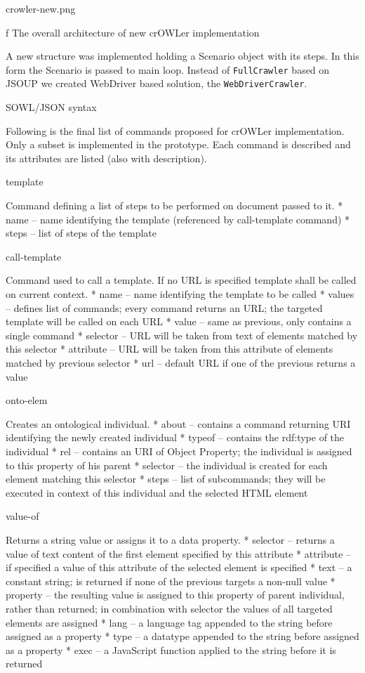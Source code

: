 \midinsert {}
\picw=12cm \cinspic crowler-new.png
\caption/f The overall architecture of new crOWLer implementation
\endinsert

A new structure was implemented holding a Scenario object with its steps.  In
this form the Scenario is passed to main loop. Instead of {\tt FullCrawler}
based on JSOUP we created WebDriver based solution, the {\tt WebDriverCrawler}. 


\sec SOWL/JSON syntax

Following is the final list of commands proposed for crOWLer implementation.
Only a subset is implemented in the prototype. Each command is described and
its attributes are listed (also with description). 


\secc template %

Command defining a list of steps to be performed on document passed to it. 
\begitems
  * name -- name identifying the template (referenced by call-template command)
  * steps -- list of steps of the template
\enditems


\secc call-template %

Command used to call a template. If no URL is specified template shall be
called on current context. 
\begitems
  * name -- name identifying the template to be called
  * values -- defines list of commands; every command returns an URL;
    the targeted template will be called on each URL
  * value -- same as previous, only contains a single command
  * selector -- URL will be taken from text of elements matched by this selector
  * attribute -- URL will be taken from this attribute of elements matched by previous selector
  * url -- default URL if one of the previous returns a value 
\enditems


\secc onto-elem

Creates an ontological individual. 
\begitems
  * about -- contains a command returning URI identifying the newly created individual
  * typeof -- contains the rdf:type of the individual
  * rel -- contains an URI of Object Property; the individual is assigned to this property of his parent
  * selector -- the individual is created for each element matching this selector
  * steps -- list of subcommands; they will be executed in context of this individual
            and the selected HTML element
\enditems


\secc value-of

Returns a string value or assigns it to a data property. 
\begitems
  * selector -- returns a value of text content of the first element specified by this attribute
  * attribute -- if specified a value of this attribute of the selected element is specified
  * text -- a constant string; is returned if none of the previous targets a non-null value
  * property -- the resulting value is assigned to this property of parent
  individual, rather than returned; in combination with selector the values of all
  targeted elements are assigned
  * lang -- a language tag appended to the string before assigned as a property
  * type -- a datatype appended to the string  before assigned as a property
  * exec -- a JavaScript function applied to the string before it is returned
\enditems


